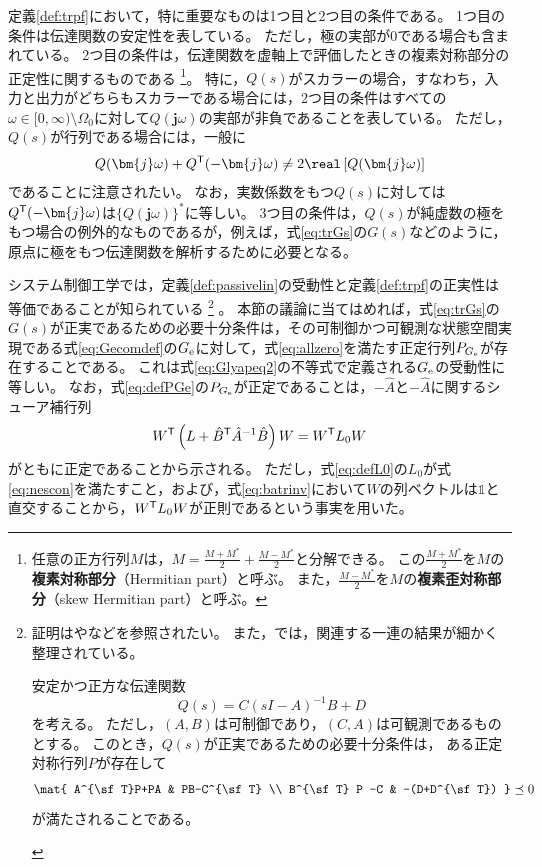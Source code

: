 \documentclass[tombow,dvipdfmx]{corona-a5-1.1}
\begin{document}
定義\ref{def:trpf}において，特に重要なものは1つ目と2つ目の条件である。
1つ目の条件は伝達関数の安定性を表している。
ただし，極の実部が0である場合も含まれている。
2つ目の条件は，伝達関数を虚軸上で評価したときの複素対称部分の正定性に関するものである
\footnote{
任意の正方行列$M$は，$M=\tfrac{M+M^*}{2}+\tfrac{M-M^*}{2}$と分解できる。
この$\tfrac{M+M^*}{2}$を$M$の\textbf{複素対称部分}（Hermitian part）と呼ぶ。
また，$\tfrac{M-M^*}{2}$を$M$の\textbf{複素歪対称部分}（skew Hermitian part）と呼ぶ。
}。
特に，$Q(s)$がスカラーの場合，すなわち，入力と出力がどちらもスカラーである場合には，2つ目の条件はすべての$\omega \in [0,\infty)\setminus \Omega_0$に対して$Q(\bm{j}\omega)$の実部が非負であることを表している。
ただし，$Q(s)$が行列である場合には，一般に
\begin{align*}
Q(\bm{j} \omega) + Q^{\sf T}(-\bm{j} \omega) \neq 2 \real\left[ Q(\bm{j} \omega) \right]
\end{align*}
であることに注意されたい。
なお，実数係数をもつ$Q(s)$に対しては$Q^{\sf T}( -\bm{j} \omega)$は$\{Q(\bm{j} \omega)\}^*$に等しい。
3つ目の条件は，$Q(s)$が純虚数の極をもつ場合の例外的なものであるが，例えば，式\ref{eq:trGs}の$G(s)$などのように，原点に極をもつ伝達関数を解析するために必要となる。


システム制御工学では，定義\ref{def:passivelin}の受動性と定義\ref{def:trpf}の正実性は等価であることが知られている
\footnote{
証明は\cite[Theorem 5.31]{antoulas2005approximation}や\cite[Theorem 3]{anderson1967system}などを参照されたい。
また，\cite{kottenstette2010relationships}では，関連する一連の結果が細かく整理されている。
\begin{補題*}
安定かつ正方な伝達関数
\[
Q(s)=C(sI-A)^{-1}B + D
\]
を考える。
ただし，$(A,B)$は可制御であり，$(C,A)$は可観測であるものとする。
このとき，$Q(s)$が正実であるための必要十分条件は，
ある正定対称行列$P$が存在して
\begin{align*}%
\mat{
A^{\sf T}P+PA & PB-C^{\sf T} \\
B^{\sf T} P -C & -(D+D^{\sf T})
}\preceq 0
\end{align*}
が満たされることである。
\end{補題*}
}
。
本節の議論に当てはめれば，式\ref{eq:trGs}の$G(s)$が正実であるための必要十分条件は，その可制御かつ可観測な状態空間実現である式\ref{eq:Gecomdef}の$G_{\rm e}$に対して，式\ref{eq:allzero}を満たす正定行列$P_{G_{\rm e}}$が存在することである。
これは式\ref{eq:Glyapeq2}の不等式で定義される$G_{\rm e}$の受動性に等しい。
なお，式\ref{eq:defPGe}の$P_{G_{\rm e}}$が正定であることは，$-\hat{A}$と$-\hat{A}$に関するシューア補行列
\[
W^{\sf T} \left(L+\hat{B}^{\sf T} \hat{A}^{-1} \hat{B} \right) W
=  W^{\sf T} L_0 W
\]
がともに正定であることから示される。
ただし，式\ref{eq:defL0}の$L_0$が式\ref{eq:nescon}を満たすこと，および，式\ref{eq:batrinv}において$W$の列ベクトルは$\mathds{1}$と直交することから，$W^{\sf T} L_0 W$が正則であるという事実を用いた。
\end{document}

